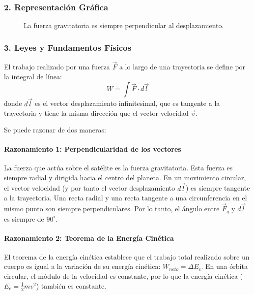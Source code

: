 \subsubsection*{2. Representación Gráfica}
\begin{figure}[H]
    \centering
    \caption{La fuerza gravitatoria es siempre perpendicular al desplazamiento.}
\end{figure}

\subsubsection*{3. Leyes y Fundamentos Físicos}
El trabajo realizado por una fuerza $\vec{F}$ a lo largo de una trayectoria se define por la integral de línea:
$$ W = \int \vec{F} \cdot d\vec{l} $$
donde $d\vec{l}$ es el vector desplazamiento infinitesimal, que es tangente a la trayectoria y tiene la misma dirección que el vector velocidad $\vec{v}$.

Se puede razonar de dos maneras:
\paragraph*{Razonamiento 1: Perpendicularidad de los vectores}
La fuerza que actúa sobre el satélite es la fuerza gravitatoria. Esta fuerza es siempre radial y dirigida hacia el centro del planeta. En un movimiento circular, el vector velocidad (y por tanto el vector desplazamiento $d\vec{l}$) es siempre tangente a la trayectoria. Una recta radial y una recta tangente a una circunferencia en el mismo punto son siempre perpendiculares. Por lo tanto, el ángulo entre $\vec{F}_g$ y $d\vec{l}$ es siempre de $90^\circ$.

\paragraph*{Razonamiento 2: Teorema de la Energía Cinética}
El teorema de la energía cinética establece que el trabajo total realizado sobre un cuerpo es igual a la variación de su energía cinética: $W_{neto} = \Delta E_c$. En una órbita circular, el módulo de la velocidad es constante, por lo que la energía cinética ($E_c = \frac{1}{2}mv^2$) también es constante.

